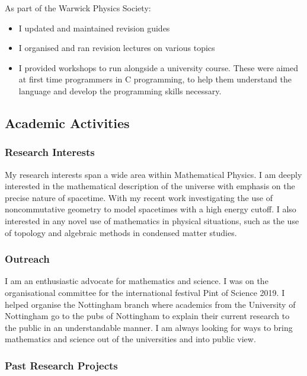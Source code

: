 \documentclass[10pt]{article}
\providecommand{\tightlist}{%
  \setlength{\itemsep}{0pt}\setlength{\parskip}{0pt}}
\begin{document}
\begin{itemize}
  As part of the Warwick Physics Society:

  \begin{itemize}
  \tightlist
  \item
    I updated and maintained revision guides
  \item
    I organised and ran revision lectures on various topics
  \item
    I provided workshops to run alongside a university course. These
    were aimed at first time programmers in C programming, to help them
    understand the language and develop the programming skills
    necessary.
  \end{itemize}
\end{itemize}

\subsection{Academic Activities}\label{academic-activities}

\subsubsection{Research Interests}\label{research-interests}

My research interests span a wide area within Mathematical Physics. I am
deeply interested in the mathematical description of the universe with
emphasis on the precise nature of spacetime. With my recent work
investigating the use of noncommutative geometry to model spacetimes
with a high energy cutoff. I also interested in any novel use of
mathematics in physical situations, such as the use of topology and
algebraic methods in condensed matter studies.

\subsubsection{Outreach}\label{outreach}

I am an enthusiastic advocate for mathematics and science. I was on the
organisational committee for the international festival Pint of Science
2019. I helped organise the Nottingham branch where academics from the
University of Nottingham go to the pubs of Nottingham to explain their
current research to the public in an understandable manner. I am always
looking for ways to bring mathematics and science out of the
universities and into public view.

\subsubsection{Past Research Projects}\label{past-research-projects}
\end{document}
